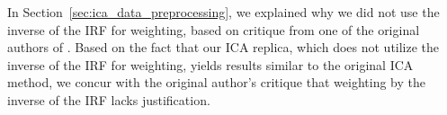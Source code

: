 In Section~\ref{sec:ica_data_preprocessing}, we explained why we did not use the inverse of the IRF for weighting, based on critique from one of the original authors of \citet{cleggRecalibrationMarsScience2017}.
Based on the fact that our ICA replica, which does not utilize the inverse of the IRF for weighting, yields results similar to the original ICA method, we concur with the original author's critique that weighting by the inverse of the IRF lacks justification.
